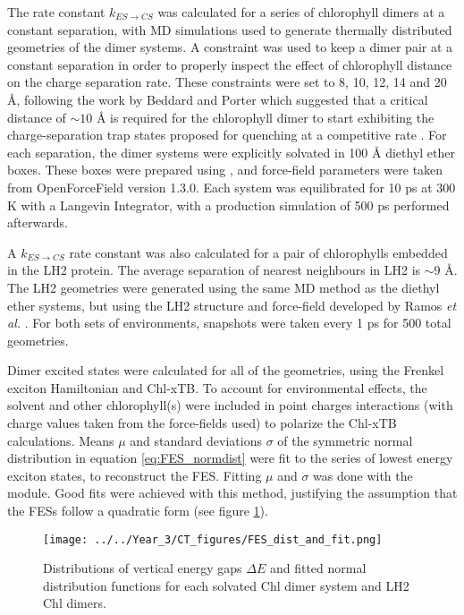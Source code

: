 The rate constant $k_{ES \rightarrow CS}$ was calculated for a series of chlorophyll dimers 
at a constant separation, with MD simulations used to generate thermally distributed
geometries of the dimer systems. A constraint was used to keep a dimer pair at a 
constant separation in order to properly inspect the effect of chlorophyll distance 
on the charge separation rate. These constraints were set to 8, 10, 12, 14 and 20 \AA{},
following the work by Beddard and Porter which suggested that a critical distance 
of $\sim 10$ \AA{} is required for the chlorophyll dimer to start exhibiting the 
charge-separation trap states proposed for quenching at a competitive rate \cite{Beddard1976b}. 
For each separation, the dimer systems were explicitly solvated in 100 \AA{} diethyl
ether boxes. These boxes were prepared using , and force-field parameters
were taken from OpenForceField version 1.3.0. Each system was equilibrated for 10 ps 
at 300 K with a Langevin Integrator, with a production simulation of 500 ps performed 
afterwards. 

A $k_{ES \rightarrow CS}$ rate constant was also calculated for a pair of chlorophylls
embedded in the LH2 protein. The average separation of nearest neighbours in LH2
is $\sim 9$ \AA{}. The LH2 geometries were generated using the same MD method as 
the diethyl ether systems, but using the LH2 structure and force-field developed
by Ramos \emph{et al.} \cite{Mennucci2019}. For both sets of environments, snapshots 
were taken every 1 ps for 500 total geometries. 

Dimer excited states were calculated for all of the geometries, using the Frenkel
exciton Hamiltonian and Chl-xTB. To account for environmental effects, the solvent
and other chlorophyll(s) were included in point charges interactions (with charge
values taken from the force-fields used) to polarize the Chl-xTB calculations. Means 
$\mu$ and standard deviations $\sigma$ of the symmetric normal distribution in equation
\ref{eq:FES_normdist} were fit to the series of lowest energy exciton states, to
reconstruct the FES. Fitting $\mu$ and $\sigma$ was done with the  
module. Good fits were achieved with this method, justifying the assumption that 
the FESs follow a quadratic form (see figure \ref{fig:fes_distributes}).

\begin{figure}
    \texttt{[image: ../../Year\_3/CT\_figures/FES\_dist\_and\_fit.png]}
    \caption{Distributions of vertical energy gaps $\Delta E$ and fitted normal
    distribution functions for each solvated Chl dimer system and LH2 Chl dimers.}
    \label{fig:fes_distributes}
\end{figure}

